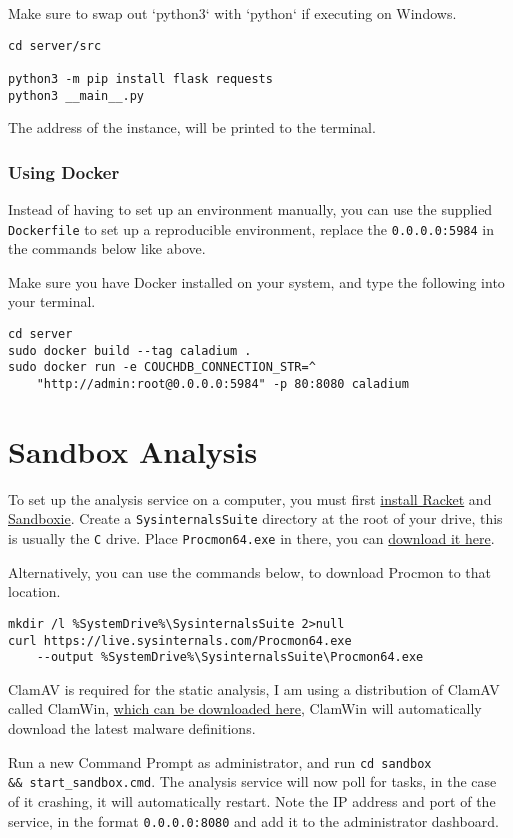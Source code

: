 \begin{appendices}
Make sure to swap out `python3` with `python` if executing on Windows.
\begin{lstlisting}
cd server/src

python3 -m pip install flask requests
python3 __main__.py
\end{lstlisting}
The address of the instance, will be printed to the terminal.

\subsubsection{Using Docker}
Instead of having to set up an environment manually,
you can use the supplied \texttt{Dockerfile}
to set up a reproducible environment,
replace the \texttt{0.0.0.0:5984} in the commands below like above.

Make sure you have Docker installed on your system,
and type the following into your terminal.

\begin{lstlisting}
cd server
sudo docker build --tag caladium .
sudo docker run -e COUCHDB_CONNECTION_STR=^
    "http://admin:root@0.0.0.0:5984" -p 80:8080 caladium
\end{lstlisting}
\section{Sandbox Analysis}
To set up the analysis service on a computer, you must first
\href{https://download.racket-lang.org/}{install Racket} and
\href{https://sandboxie-plus.com/}{Sandboxie}.
Create a \texttt{SysinternalsSuite} directory at the root of your drive,
this is usually the \texttt{C} drive.
Place \texttt{Procmon64.exe} in there, you can
\href{https://learn.microsoft.com/en-us/sysinternals/downloads/procmon}{download it here}.

Alternatively, you can use the commands below, to download Procmon to that location.
\begin{lstlisting}
mkdir /l %SystemDrive%\SysinternalsSuite 2>null
curl https://live.sysinternals.com/Procmon64.exe
    --output %SystemDrive%\SysinternalsSuite\Procmon64.exe
\end{lstlisting}

ClamAV is required for the static analysis,
I am using a distribution of ClamAV called ClamWin,
\href{https://clamwin.com/content/view/18/46/}{which can be downloaded here},
ClamWin will automatically download the latest malware definitions.

Run a new Command Prompt as administrator,
and run \texttt{cd sandbox \\
\&\& start\_sandbox.cmd}.
The analysis service will now poll for tasks,
in the case of it crashing, it will automatically restart.
Note the IP address and port of the service,
in the format \texttt{0.0.0.0:8080}
and add it to the administrator dashboard.

\end{appendices}
